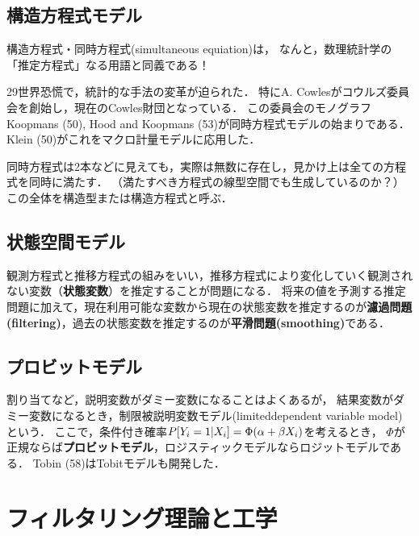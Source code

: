 \documentclass[uplatex,dvipdfmx]{jsreport}
\begin{document}
\section{構造方程式モデル}

\begin{tcolorbox}[colframe=ForestGreen, colback=ForestGreen!10!white,breakable,colbacktitle=ForestGreen!40!white,coltitle=black,fonttitle=\bfseries\sffamily,
title=]
    構造方程式・同時方程式(simultaneous equiation)は，
    なんと，数理統計学の「推定方程式」なる用語と同義である！
\end{tcolorbox}

\begin{history}[同時方程式モデル]
    29世界恐慌で，統計的な手法の変革が迫られた．
    特にA. Cowlesがコウルズ委員会を創始し，現在のCowles財団となっている．
    この委員会のモノグラフKoopmans (50), Hood and Koopmans (53)が同時方程式モデルの始まりである．
    Klein (50)がこれをマクロ計量モデルに応用した．
\end{history}

同時方程式は2本などに見えても，実際は無数に存在し，見かけ上は全ての方程式を同時に満たす．
（満たすべき方程式の線型空間でも生成しているのか？）
この全体を構造型または構造方程式と呼ぶ．

\section{状態空間モデル}

観測方程式と推移方程式の組みをいい，推移方程式により変化していく観測されない変数（\textbf{状態変数}）を推定することが問題になる．
将来の値を予測する推定問題に加えて，現在利用可能な変数から現在の状態変数を推定するのが\textbf{濾過問題(filtering)}，過去の状態変数を推定するのが\textbf{平滑問題(smoothing)}である．

\section{プロビットモデル}

割り当てなど，説明変数がダミー変数になることはよくあるが，
結果変数がダミー変数になるとき，制限被説明変数モデル(limiteddependent variable model)という．
ここで，条件付き確率$P[Y_i=1|X_i]=\Phi(\alpha+\beta X_i)$を考えるとき，
$\Phi$が正規ならば\textbf{プロビットモデル}，ロジスティックモデルならロジットモデルである．
Tobin (58)はTobitモデルも開発した．

\chapter{フィルタリング理論と工学}
\end{document}
